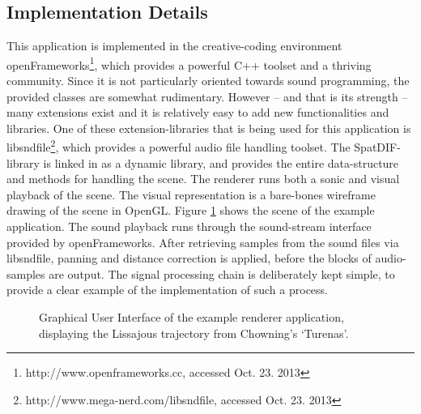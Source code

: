 \documentclass[a4paper]{article}
\begin{document}
\subsection{Implementation Details}

This application is implemented in the creative-coding environment openFrameworks\footnote{http://www.openframeworks.cc, accessed Oct. 23. 2013}, which provides a powerful C++ toolset and a thriving community.
Since it is not particularly oriented towards sound programming, the provided classes are somewhat rudimentary.
However -- and that is its strength -- many extensions exist and it is relatively easy to add new functionalities and libraries.
One of these extension-libraries that is being used for this application is libsndfile\footnote{http://www.mega-nerd.com/libsndfile, accessed Oct. 23. 2013}, which provides a powerful audio file handling toolset.
The SpatDIF-library is linked in as a dynamic library, and provides the entire data-structure and methods for handling the scene.
The renderer runs both a sonic and visual playback of the scene.
The visual representation is a bare-bones wireframe drawing of the scene in OpenGL.
Figure \ref{fig:screenshot} shows the scene of the example application.
The sound playback runs through the sound-stream interface provided by openFrameworks.
After retrieving samples from the sound files via libsndfile, panning and distance correction is applied, before the blocks of audio-samples are output.
The signal processing chain is deliberately kept simple, to provide a clear example of the implementation of such a process.

\begin{figure}[h]
\centerline{ }
\caption{Graphical User Interface of the example renderer application, displaying the Lissajous trajectory from Chowning's `Turenas'. 
}
\label{fig:screenshot}
\end{figure}
\end{document}
